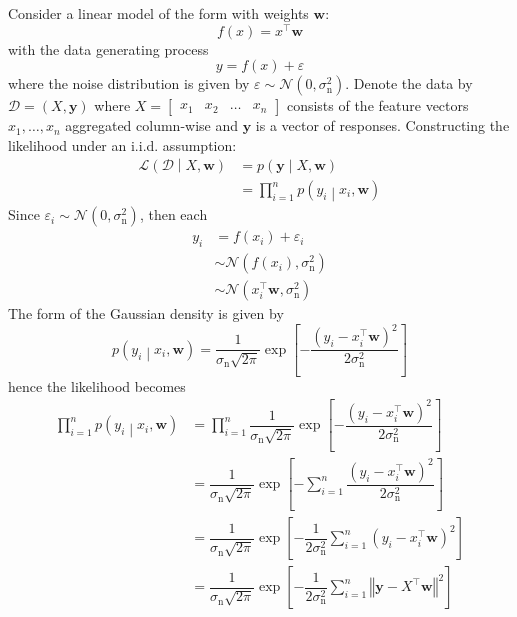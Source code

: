 \documentclass[11pt]{report} %
\begin{document}
Consider a linear model of the form with weights $\mathbf{w}$:
\begin{equation}
f\left(x\right) = x^{\top}\mathbf{w}
\end{equation}
with the data generating process
\begin{equation}
y=f\left(x\right)+\varepsilon
\end{equation}
where the noise distribution is given by $\varepsilon\sim\mathcal{N}\left(0,\sigma_{\mathrm{n}}^{2}\right)$. Denote the data by $\mathcal{D}=\left(X,\mathbf{y}\right)$ where $X =\begin{bmatrix}x_{1} & x_{2} & \dots & x_{n}\end{bmatrix}$ consists of the feature vectors $x_{1}, \dots, x_{n}$ aggregated column-wise and $\mathbf{y}$ is a vector of responses. Constructing the likelihood under an i.i.d. assumption:
\begin{align}
\mathcal{L}\left(\mathcal{D}\middle|X,\mathbf{w}\right) &= p\left(\mathbf{y}\middle|X,\mathbf{w}\right) \\
&= \prod_{i=1}^{n}p\left(y_{i}\middle|x_{i},\mathbf{w}\right)
\end{align}
Since $\varepsilon_{i}\sim\mathcal{N}\left(0,\sigma_{\mathrm{n}}^{2}\right)$, then each
\begin{align}
y_{i} &= f\left(x_{i}\right)+\varepsilon_{i} \\
&\sim \mathcal{N}\left(f\left(x_{i}\right),\sigma_{\mathrm{n}}^{2}\right) \\
&\sim \mathcal{N}\left(x_{i}^{\top}\mathbf{w},\sigma_{\mathrm{n}}^{2}\right)
\end{align}
The form of the Gaussian density is given by
\begin{equation}
p\left(y_{i}\middle|x_{i},\mathbf{w}\right)=\dfrac{1}{\sigma_{\mathrm{n}}\sqrt{2\pi}}\exp\left[-\dfrac{\left(y_{i}-x_{i}^{\top}\mathbf{w}\right)^{2}}{2\sigma_{\mathrm{n}}^{2}}\right]
\end{equation}
hence the likelihood becomes
\begin{align}
\prod_{i=1}^{n}p\left(y_{i}\middle|x_{i},\mathbf{w}\right) &= \prod_{i=1}^{n}\dfrac{1}{\sigma_{\mathrm{n}}\sqrt{2\pi}}\exp\left[-\dfrac{\left(y_{i}-x_{i}^{\top}\mathbf{w}\right)^{2}}{2\sigma_{\mathrm{n}}^{2}}\right] \\
&= \dfrac{1}{\sigma_{\mathrm{n}}\sqrt{2\pi}}\exp\left[-\sum_{i=1}^{n}\dfrac{\left(y_{i}-x_{i}^{\top}\mathbf{w}\right)^{2}}{2\sigma_{\mathrm{n}}^{2}}\right] \\
&= \dfrac{1}{\sigma_{\mathrm{n}}\sqrt{2\pi}}\exp\left[-\dfrac{1}{2\sigma_{\mathrm{n}}^{2}}\sum_{i=1}^{n}\left(y_{i}-x_{i}^{\top}\mathbf{w}\right)^{2}\right] \\
&= \dfrac{1}{\sigma_{\mathrm{n}}\sqrt{2\pi}}\exp\left[-\dfrac{1}{2\sigma_{\mathrm{n}}^{2}}\sum_{i=1}^{n}\left\Vert \mathbf{y}-X^{\top}\mathbf{w}\right\Vert ^{2}\right]
\end{align}
\end{document}
